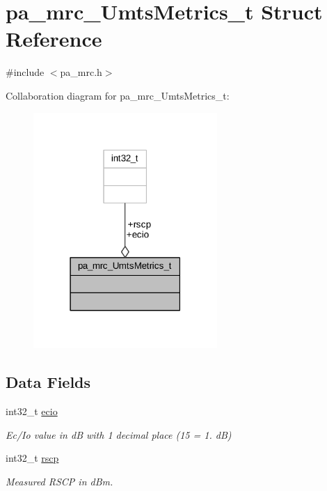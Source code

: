 \hypertarget{structpa__mrc___umts_metrics__t}{}\section{pa\+\_\+mrc\+\_\+\+Umts\+Metrics\+\_\+t Struct Reference}
\label{structpa__mrc___umts_metrics__t}


{\ttfamily \#include $<$pa\+\_\+mrc.\+h$>$}



Collaboration diagram for pa\+\_\+mrc\+\_\+\+Umts\+Metrics\+\_\+t\+:
\nopagebreak
\begin{figure}[H]
\begin{center}
\leavevmode
\includegraphics[width=198pt]{structpa__mrc___umts_metrics__t__coll__graph}
\end{center}
\end{figure}
\subsection*{Data Fields}
\begin{DoxyCompactItemize}
\item 
int32\+\_\+t \hyperlink{structpa__mrc___umts_metrics__t_a51ce610279899a58e28158e4bd457084}{ecio}
\begin{DoxyCompactList}\small\item\em Ec/\+Io value in dB with 1 decimal place (15 = 1. dB) \end{DoxyCompactList}\item 
int32\+\_\+t \hyperlink{structpa__mrc___umts_metrics__t_af9c3ed3a4d378dcbae464253b933d797}{rscp}
\begin{DoxyCompactList}\small\item\em Measured R\+S\+CP in d\+Bm. \end{DoxyCompactList}\end{DoxyCompactItemize}


